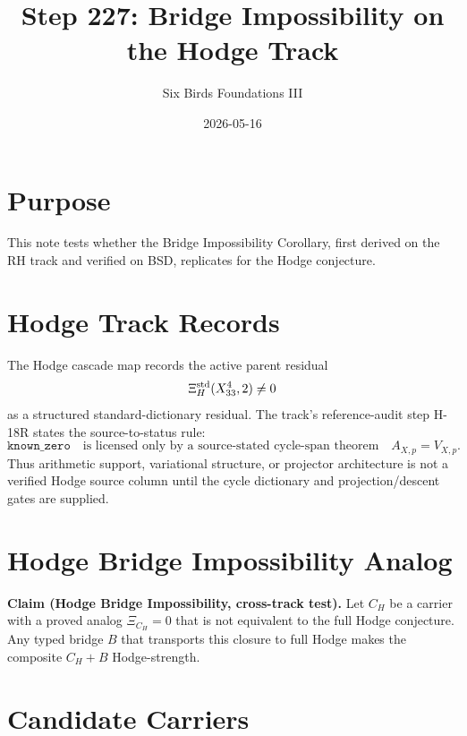 \documentclass{article}
\title{Step 227: Bridge Impossibility on the Hodge Track}
\author{Six Birds Foundations III}
\date{2026-05-16}
\begin{document}
\maketitle

\section{Purpose}

This note tests whether the Bridge Impossibility Corollary, first derived on the RH track and verified on BSD, replicates for the Hodge conjecture.

\section{Hodge Track Records}

The Hodge cascade map records the active parent residual
\[
  \Xi_H^{\rm std}(X^4_{33},2)\neq 0
\]
as a structured standard-dictionary residual. The track's reference-audit step H-18R states the source-to-status rule:
\[
  \texttt{known\_zero}\quad\text{is licensed only by a source-stated cycle-span theorem}\quad A_{X,p}=V_{X,p}.
\]
Thus arithmetic support, variational structure, or projector architecture is not a verified Hodge source column until the cycle dictionary and projection/descent gates are supplied.

\section{Hodge Bridge Impossibility Analog}

\textbf{Claim (Hodge Bridge Impossibility, cross-track test).}
Let \(C_H\) be a carrier with a proved analog \(\Xi_{C_H}=0\) that is not equivalent to the full Hodge conjecture. Any typed bridge \(B\) that transports this closure to full Hodge makes the composite \(C_H+B\) Hodge-strength.

\section{Candidate Carriers}
\end{document}

